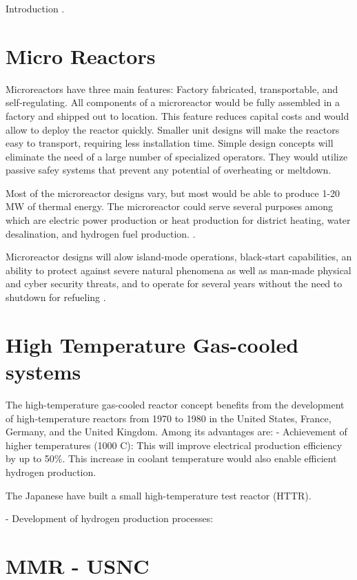 Introduction \cite{huff_extensions_2014}.

\section{Micro Reactors}

Microreactors have three main features: Factory fabricated, transportable, and self-regulating. All components of a microreactor would be fully assembled in a factory and shipped out to location. This feature reduces capital costs and would allow to deploy the reactor quickly. Smaller unit designs will make the reactors easy to transport, requiring less installation time. Simple design concepts will eliminate the need of a large number of specialized operators. They would utilize passive safey systems that prevent any potential of overheating or meltdown.

Most of the microreactor designs vary, but most would be able to produce 1-20 MW of thermal energy. The microreactor could serve several purposes among which are electric power production or heat production for district heating, water desalination, and hydrogen fuel production.
\cite{noauthor_ultimate_2019}.

Microreactor designs will alow island-mode operations, black-start capabilities, an ability to protect against severe natural phenomena as well as man-made physical and cyber security threats, and to operate for several years without the need to shutdown for refueling \cite{nichol_roadmap_2018}.

\section{High Temperature Gas-cooled systems}

The high-temperature gas-cooled reactor concept benefits from the development of high-temperature reactors from 1970 to 1980 in the United States, France, Germany, and the United Kingdom. 
Among its advantages are:
- Achievement of higher temperatures (1000 C): This will improve electrical production efficiency by up to 50\%. This increase in coolant temperature would also enable efficient hydrogen production.

The Japanese have built a small high-temperature test reactor (HTTR). 

- Development of hydrogen production processes:
\cite{france_gas-cooled_2006}

\section{MMR - USNC}

